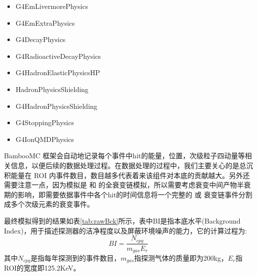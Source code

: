 \begin{itemize}
    \item G4EmLivermorePhysics
    \item G4EmExtraPhysics
    \item G4DecayPhysics
    \item G4RadioactiveDecayPhysics
    \item G4HadronElasticPhysicsHP
    \item HadronPhysicsShielding
    \item G4HadronPhysicsShielding
    \item G4StoppingPhysics
    \item G4IonQMDPhysics     
\end{itemize}
BambooMC 框架会自动地记录每个事件中hit的能量，位置，次级粒子四动量等相关信息，以便后续的数据处理过程。在数据处理的过程中，我们主要关心的是总沉积能量在 ROI 内事件数目，数目越多代表着来该组件对本底的贡献越大。另外还需要注意一点，因为模拟是 \utte 和 \thttt 的全衰变链模拟，所以需要考虑衰变中间产物半衰期的影响，即需要依据事件中各个hit的时间信息将一个完整的 \utte 或 \thttt 衰变链事件分割成多个次级元素的衰变事件。

最终模拟得到的结果如表\ref{tab:rawBck}所示，表中BI是指本底水平(Background Index)，用于描述探测器的洁净程度以及屏蔽环境噪声的能力，它的计算过程为:
\begin{equation}
    BI = \frac{N_{cpy}}{m_{gas}E_{r}}
    \label{eq:bi}
\end{equation}
其中$N_{cpy}$是指每年探测到的事件数目，$m_{gas}$指探测气体的质量即为200kg，$E_{r}$指ROI的宽度即125.2KeV。


